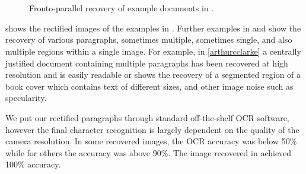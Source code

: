 \begin{figure}[t]
\centering
\begin{center}
\hspace{2mm}\\
\\
\end{center}
\caption{Fronto-parallel recovery of example documents in .}
\label{pprecover}
\end{figure}

 shows the rectified images of the examples in
. Further examples in  and 
 show the recovery of various paragraphs, sometimes
multiple, sometimes single, and also multiple regions within a single image. 
For example, in \ref{arthurcclarke} a centrally justified document containing
multiple paragraphs has been recovered at high resolution and is easily readable
or  shows the recovery of a segmented region of a book cover
which contains text of different sizes, and other image noise such as specularity.

We put our rectified paragraphs through standard off-the-shelf OCR software,
however the final character recognition is largely dependent on the quality of
the camera resolution. In some recovered images, the OCR accuracy was below 50\%
while for others the accuracy was above 90\%.  The image recovered in
 achieved 100\% accuracy.

